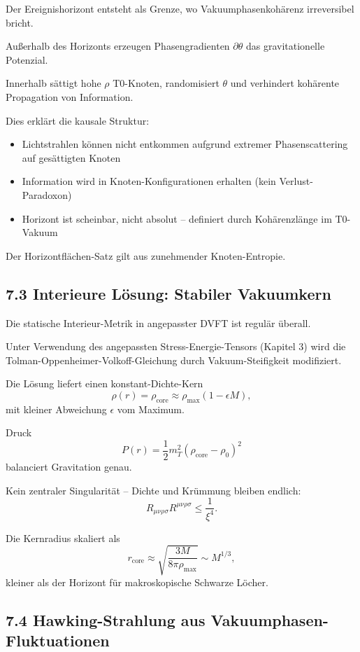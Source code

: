	Der Ereignishorizont entsteht als Grenze, wo Vakuumphasenkohärenz irreversibel bricht.
	
	Außerhalb des Horizonts erzeugen Phasengradienten $\partial \theta$ das gravitationelle Potenzial.
	
	Innerhalb sättigt hohe $\rho$ T0-Knoten, randomisiert $\theta$ und verhindert kohärente Propagation von Information.
	
	Dies erklärt die kausale Struktur:
	\begin{itemize}
		\item Lichtstrahlen können nicht entkommen aufgrund extremer Phasenscattering auf gesättigten Knoten
		\item Information wird in Knoten-Konfigurationen erhalten (kein Verlust-Paradoxon)
		\item Horizont ist scheinbar, nicht absolut – definiert durch Kohärenzlänge im T0-Vakuum
	\end{itemize}
	
	Der Horizontflächen-Satz gilt aus zunehmender Knoten-Entropie.
	
	\subsection{7.3 Interieure Lösung: Stabiler Vakuumkern}
	
	Die statische Interieur-Metrik in angepasster DVFT ist regulär überall.
	
	Unter Verwendung des angepassten Stress-Energie-Tensors (Kapitel 3) wird die Tolman-Oppenheimer-Volkoff-Gleichung durch Vakuum-Steifigkeit modifiziert.
	
	Die Lösung liefert einen konstant-Dichte-Kern
	\[
	\rho(r) = \rho_{\text{core}} \approx \rho_{\text{max}} (1 - \epsilon M),
	\]
	mit kleiner Abweichung $\epsilon$ vom Maximum.
	
	Druck
	\[
	P(r) = \frac{1}{2} m_T^2 (\rho_{\text{core}} - \rho_0)^2
	\]
	balanciert Gravitation genau.
	
	Kein zentraler Singularität – Dichte und Krümmung bleiben endlich:
	\[
	R_{\mu\nu\rho\sigma} R^{\mu\nu\rho\sigma} \leq \frac{1}{\xi^4}.
	\]
	
	Die Kernradius skaliert als
	\[
	r_{\text{core}} \approx \sqrt{\frac{3M}{8\pi \rho_{\text{max}}}} \sim M^{1/3},
	\]
	kleiner als der Horizont für makroskopische Schwarze Löcher.
	
	\subsection{7.4 Hawking-Strahlung aus Vakuumphasen-Fluktuationen}
	
